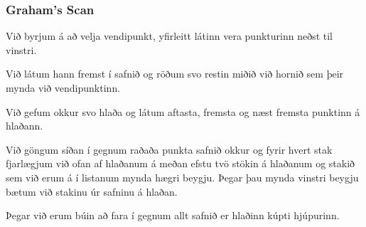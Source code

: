 {
	\frametitle{Graham's Scan}
	{
		\item<1-> Við byrjum á að velja vendipunkt, yfirleitt látinn vera punkturinn neðst til vinstri.
		\item<2-> Við látum hann fremst í safnið og röðum svo restin miðið við hornið sem þeir mynda við vendipunktinn.
		\item<3-> Við gefum okkur svo hlaða og látum aftasta, fremsta og næst fremsta punktinn á hlaðann.
		\item<4-> Við göngum síðan í gegnum raðaða punkta safnið okkur og fyrir hvert stak fjarlægjum við ofan af hlaðanum
			á meðan efstu tvö stökin á hlaðanum og stakið sem við erum á í listanum mynda hægri beygju. Þegar þau mynda
			vinstri beygju bætum við stakinu úr safninu á hlaðan.
		\item<5-> Þegar við erum búin að fara í gegnum allt safnið er hlaðinn kúpti hjúpurinn.
	}
}

